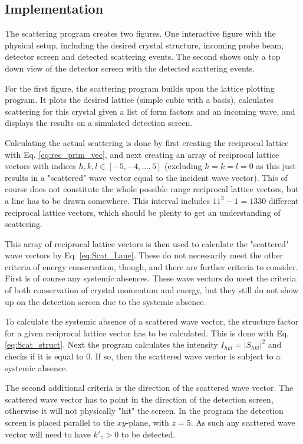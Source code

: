 \documentclass[main.tex]{subfiles}
\begin{document}
	\subsection{Implementation}	
	The scattering program creates two figures. One interactive figure with the physical setup, including the desired crystal structure, incoming probe beam, detector screen and detected scattering events. The second shows only a top down view of the detector screen with the detected scattering events.
	
	For the first figure, the scattering program builds upon the lattice plotting program. It plots the desired lattice (simple cubic with a basis), calculates scattering for this crystal given a list of form factors and an incoming wave, and displays the results on a simulated detection screen.
	
	Calculating the actual scattering is done by first creating the reciprocal lattice with Eq. \eqref{eq:rec_prim_vec}, and next creating an array of reciprocal lattice vectors with indices $ h,k,l \in [-5, -4, \dots, 5] $ (excluding $ h=k=l=0 $ as this just results in a "scattered" wave vector equal to the incident wave vector). This of course does not constitute the whole possible range reciprocal lattice vectors, but a line has to be drawn somewhere. This interval includes $ 11^3 - 1 = 1330$ different reciprocal lattice vectors, which should be plenty to get an understanding of scattering.
	
	This array of reciprocal lattice vectors is then used to calculate the "scattered" wave vectors by Eq. \eqref{eq:Scat_Laue}. These do not necessarily meet the other criteria of energy conservation, though, and there are further criteria to consider. First is of course any systemic absences. These wave vectors do meet the criteria of both conservation of crystal momentum and energy, but they still do not show up on the detection screen due to the systemic absence.
	
	To calculate the systemic absence of a scattered wave vector, the structure factor for a given reciprocal lattice vector has to be calculated. This is done with Eq. \eqref{eq:Scat_struct}. Next the program calculates the intensity $ I_{hkl}=|S_{hkl}|^2 $ and checks if it is equal to 0. If so, then the scattered wave vector is subject to a systemic absence.
	
	The second additional criteria is the direction of the scattered wave vector. The scattered wave vector has to point in the direction of the detection screen, otherwise it will not physically "hit" the screen. In the program the detection screen is placed parallel to the $ xy $-plane, with $ z=5 $. As such any scattered wave vector will need to have $ k'_z > 0 $ to be detected.
	
\end{document}
